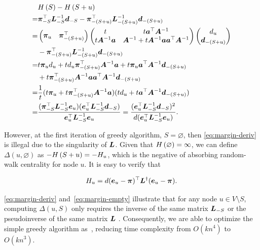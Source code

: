 \documentclass[sigconf]{acmart}
\begin{document}
\begin{equation}\label{eq:margin-deriv}
    \begin{split}
        &H\left(S\right)-H\left(S+u\right)\\
        =&\boldsymbol{\pi}_{-S}^\top\boldsymbol{L}_{-S}^{-1}\boldsymbol{d}_{-S}-\boldsymbol{\pi}_{-(S+u)}^\top\boldsymbol{L}_{-(S+u)}^{-1}\boldsymbol{d}_{-(S+u)}\\
        =&\begin{pmatrix}\boldsymbol{\pi}_u&\boldsymbol{\pi}_{-(S+u)}^\top\end{pmatrix}\begin{pmatrix}t & t\boldsymbol{a}^\top\boldsymbol{A}^{-1} \\t\boldsymbol{A}^{-1}\boldsymbol{a}&\boldsymbol{A}^{-1}+t\boldsymbol{A}^{-1}\boldsymbol{a}\boldsymbol{a}^\top\boldsymbol{A}^{-1}\end{pmatrix}\begin{pmatrix}d_u\\\boldsymbol{d}_{-(S+u)}\end{pmatrix}\\
        &-\boldsymbol{\pi}_{-(S+u)}^\top\boldsymbol{L}_{-(S+u)}^{-1}\boldsymbol{d}_{-(S+u)}\\
        =&t\boldsymbol{\pi}_ud_u+td_u\boldsymbol{\pi}_{-(S+u)}^\top\boldsymbol{A}^{-1}\boldsymbol{a}+t\boldsymbol{\pi}_u\boldsymbol{a}^\top\boldsymbol{A}^{-1}\boldsymbol{d}_{-(S+u)}\\
        &+t\boldsymbol{\pi}_{-(S+u)}^\top\boldsymbol{A}^{-1}\boldsymbol{a}\boldsymbol{a}^\top\boldsymbol{A}^{-1}\boldsymbol{d}_{-(S+u)}\\
        =&\frac1t(t\boldsymbol{\pi}_u+t\boldsymbol{\pi}_{-(S+u)}^\top\boldsymbol{A}^{-1}\boldsymbol{a})(td_u+t\boldsymbol{a}^\top\boldsymbol{A}^{-1}\boldsymbol{d}_{-(S+u)})\\
        =&\frac{(\boldsymbol{\pi}_{-S}^\top\boldsymbol{L}_{-S}^{-1}\boldsymbol{e}_u)(\boldsymbol{e}_u^\top\boldsymbol{L}_{-S}^{-1}\boldsymbol{d}_{-S})}{\boldsymbol{e}_u^\top\boldsymbol{L}_{-S}^{-1}\boldsymbol{e}_u}=\frac{(\boldsymbol{e}_u^\top\boldsymbol{L}_{-S}^{-1}\boldsymbol{d}_{-S})^2}{d(\boldsymbol{e}_u^\top\boldsymbol{L}_{-S}^{-1}\boldsymbol{e}_u)}.
    \end{split}
\end{equation}

However, at the first iteration of greedy algorithm, \(S=\varnothing\), then \eqref{eq:margin-deriv} is illegal due to the singularity of \(\boldsymbol{L}\).
Given that \(H\left(\varnothing\right)=\infty\), we can define \(\Delta(u,\varnothing)\) as \(-H\left(S+u\right)=-H_u\), which is the negative of absorbing random-walk centrality for node \(u\).
It is easy to verify that~\cite{ZhXuZh20}

\begin{equation}\label{eq:margin-empty}
    H_u=d(\boldsymbol{e}_u-\boldsymbol{\pi})^\top\boldsymbol{L}^\dagger(\boldsymbol{e}_u-\boldsymbol{\pi}).
\end{equation}

\eqref{eq:margin-deriv} and~\eqref{eq:margin-empty} illustrate that for any node \(u\in V\setminus S\), computing \(\Delta(u,S)\) only requires the inverse of the same matrix \(\boldsymbol{L}_{-S}\) or the pseudoinverse of the same matrix \(\boldsymbol{L}\) . Consequently, we are able to optimize the simple greedy algorithm as~, reducing time complexity from \(O(kn^4)\) to \(O(kn^3)\).
\end{document}
